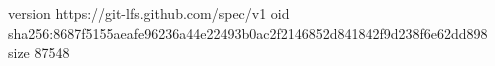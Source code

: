 version https://git-lfs.github.com/spec/v1
oid sha256:8687f5155aeafe96236a44e22493b0ac2f2146852d841842f9d238f6e62dd898
size 87548
